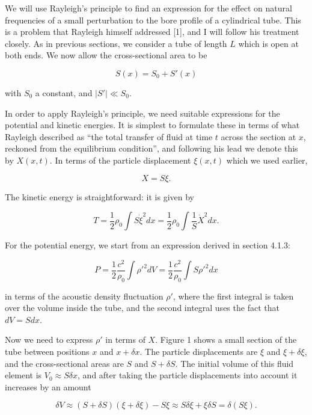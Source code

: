   We will use Rayleigh's principle to find an expression for the effect on 
  natural frequencies of a small perturbation to the bore profile of a 
  cylindrical tube. This is a problem that Rayleigh himself addressed [1], and 
  I will follow his treatment closely. As in previous sections, we consider a 
  tube of length $L$ which is open at both ends. We now allow the 
  cross-sectional area to be 

  $$S(x) = S_0 +S'(x) \tag{1}$$ 

  with $S_0$ a constant, and $|S'| \ll S_0$. 

  In order to apply Rayleigh's principle, we need suitable expressions for the 
  potential and kinetic energies. It is simplest to formulate these in terms of 
  what Rayleigh described as ``the total transfer of fluid at time $t$ across 
  the section at $x$, reckoned from the equilibrium condition'', and following 
  his lead we denote this by $X(x,t)$. In terms of the particle displacement 
  $\xi(x,t)$ which we used earlier, 

  $$X=S \xi . \tag{2}$$ 

  The kinetic energy is straightforward: it is given by 

  $$T=\dfrac{1}{2} \rho_0 \int{S \dot{\xi}^2 dx} = \dfrac{1}{2} \rho_0 
  \int{\dfrac{1}{S} \dot{X}^2 dx}. \tag{3}$$ 

  For the potential energy, we start from an expression derived in section 
  4.1.3: 

  $$P=\dfrac{1}{2} \dfrac{c^2}{\rho_0} \int{\rho'^2 dV}=\dfrac{1}{2} 
  \dfrac{c^2}{\rho_0} \int{S\rho'^2 dx} \tag{4}$$ 

  in terms of the acoustic density fluctuation $\rho'$, where the first 
  integral is taken over the volume inside the tube, and the second integral 
  uses the fact that $dV=S dx$. 


  Now we need to express $\rho'$ in terms of $X$. Figure 1 shows a small 
  section of the tube between positions $x$ and $x+\delta x$. The particle 
  displacements are $\xi$ and $\xi + \delta \xi$, and the cross-sectional areas 
  are $S$ and $S+\delta S$. The initial volume of this fluid element is $V_0 
  \approx S \delta x$, and after taking the particle displacements into account 
  it increases by an amount 

  $$\delta V \approx (S+\delta S)(\xi + \delta \xi) -S \xi \approx S \delta \xi 
  + \xi \delta S =\delta(S \xi) . \tag{5}$$ 

